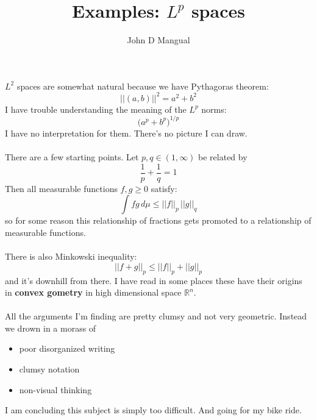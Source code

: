 \documentclass[12pt]{article}
\title{\textbf{ Examples:  $L^p$ spaces}}
\author{John D Mangual}
\date{}
\begin{document}
\selectfont \fontsize{25}{30}\selectfont

\maketitle

\noindent $L^2$ spaces are somewhat natural because we have Pythagoras theorem:
$$  \big|\big| (a,b)\big|\big|^2 = a^2 + b^2 $$
I have trouble understanding the meaning of the $L^p$ norms:
$$   \big( a^p + b^p \big)^{1/p}$$
I have no interpretation for them.  There's no picture I can draw.  \\ \\
There are a few starting points. Let $p,q \in (1, \infty)$ be related by
$$ \frac{1}{p} + \frac{1}{q}=1 $$
Then all measurable functions $f,g \geq 0$ satisfy:
$$ \int fg \, d\mu \leq \big|\big|f\big|\big|_p \, 
\big|\big|g\big|\big|_q $$
so for some reason this relationship of fractions gets promoted to a relationship of measurable functions. \\ \\
There is also Minkowski inequality:
$$ \big|\big| f + g \big|\big|_p \leq 
\big|\big| f  \big|\big|_p + 
\big|\big| g  \big|\big|_p $$
and it's downhill from there.  I have read in some places these have their origins in \textbf{convex gometry} in high dimensional space $\mathbb{R}^n$.  \\ \\
All the arguments I'm finding are pretty clumsy and not very geometric.  Instead we drown in a morass of
\begin{itemize}
\item poor disorganized writing
\item clumsy notation
\item non-visual thinking
\end{itemize}
I am concluding this subject is simply too difficult.  And going for my bike ride.

\newpage

\noindent 

\selectfont \fontsize{12}{10}\selectfont


\begin{thebibliography}{}




\end{thebibliography}
\end{document}
